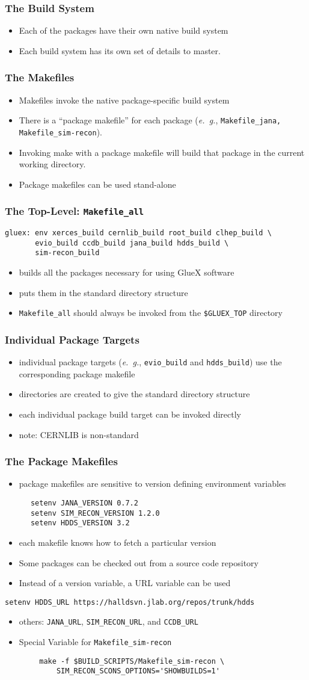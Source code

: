 \documentclass{beamer}
\newcommand{\bi}{\begin{itemize}}
\newcommand{\ei}{\end{itemize}}
\newcommand{\I}{\item}
\begin{document}
\begin{frame}\frametitle{The Build System}
\bi
\I Each of the packages have their own native build system
\I Each build system has its own set of details to master.
\ei
\end{frame}\begin{frame}\frametitle{The Makefiles}
\bi
\I Makefiles invoke the native package-specific build system
\I There is a ``package makefile'' for each package ({\it e.~g.}, {\tt Makefile\_jana, Makefile\_sim-recon}).
\I Invoking make with a package makefile will build that package in the current working directory.
\I Package makefiles can be used stand-alone
\ei
\end{frame}
\begin{frame}[fragile]
  \frametitle{The Top-Level: {\tt Makefile\_all}}

\begin{verbatim}
gluex: env xerces_build cernlib_build root_build clhep_build \
       evio_build ccdb_build jana_build hdds_build \
       sim-recon_build
\end{verbatim}
\bi
\I builds all the packages necessary for using GlueX software
\I puts them in the standard directory structure
\I {{\tt Makefile\_all}} should always be invoked from the {\tt \$GLUEX\_TOP} directory
\ei
\end{frame}
\begin{frame}\frametitle{Individual Package Targets}
\bi
\I individual package targets ({\it e.~g.}, {\tt evio\_build}
and {\tt hdds\_build}) use the corresponding package makefile
\I directories are created to give the standard directory structure
\I each individual package build target can be invoked directly
\I note: CERNLIB is non-standard
\ei
\end{frame}
\begin{frame}[fragile]
  \frametitle{The Package Makefiles}\label{section:package-makefiles}
\bi
\I package makefiles are sensitive to version defining environment variables
\ei
\begin{verbatim}
      setenv JANA_VERSION 0.7.2
      setenv SIM_RECON_VERSION 1.2.0
      setenv HDDS_VERSION 3.2
\end{verbatim}
\bi
\I each makefile knows how to fetch a particular version
\I Some packages can be checked out from a source code repository
\I Instead of a version variable, a URL variable can be used
\ei
\begin{verbatim}
setenv HDDS_URL https://halldsvn.jlab.org/repos/trunk/hdds
\end{verbatim}
\bi
\I others: {\tt JANA\_URL}, {\tt SIM\_RECON\_URL}, and {\tt CCDB\_URL}
\I Special Variable for {\tt Makefile\_sim-recon}
\ei
\begin{verbatim}
        make -f $BUILD_SCRIPTS/Makefile_sim-recon \
            SIM_RECON_SCONS_OPTIONS='SHOWBUILDS=1'
\end{verbatim}
\end{frame}
\end{document}
